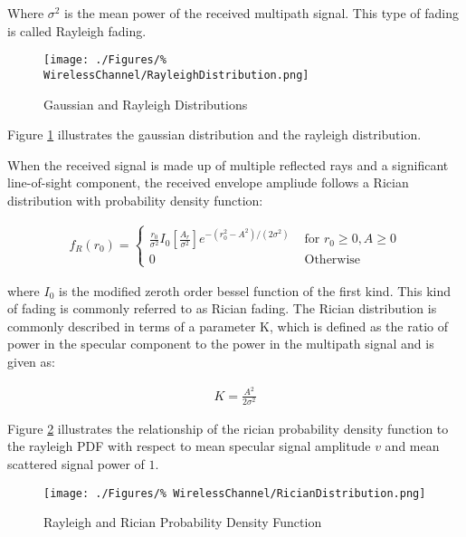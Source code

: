 Where $\sigma^{2}$ is the mean power of the received %
multipath signal. This type of fading is called Rayleigh %
fading.

\begin{figure}[h!]
	\texttt{[image: ./Figures/\%
	WirelessChannel/RayleighDistribution.png]}
	\caption{Gaussian and Rayleigh Distributions%
	\cite{Jakes74}}
	\label{fig:RayleighDistribution}
\end{figure}

Figure \ref{fig:RayleighDistribution} illustrates %
the gaussian distribution and the rayleigh %
distribution.

When the received signal is made up of multiple %
reflected rays and a significant line-of-sight %
component, the received envelope ampliude %
follows a Rician distribution with probability density %
function:

\begin{align}
	f_{R}(r_{0}) = \begin{cases}
		\frac{r_{0}}{\sigma^{2}}I_{0}%
		\left[ \frac{A_{r}}{\sigma^{2}} \right]%
		e^{-(r_{0}^{2}-A^{2})/(2 \sigma^{2})}%
		 & \text{ for } r_{0} \geq 0, A \geq 0\\
		0 & \text{ Otherwise}
	\end{cases}
	\label{eq:RicianPDF}
\end{align}

where $I_{0}$ is the modified zeroth order %
bessel function of the first kind. This kind of %
fading is commonly referred to as Rician fading. %
The Rician distribution is commonly described in %
terms of a parameter K\cite{Sklar01}, which is defined as %
the ratio of power in the specular component to the %
power in the multipath signal and is given as:

\begin{align}
	K = \frac{A^{2}}{2\sigma^{2}}
\end{align}

Figure \ref{fig:RicianDistribution} illustrates the relationship %
of the rician probability density function to the rayleigh %
PDF with respect to mean specular signal amplitude $v$ and %
mean scattered signal power of $1$.

\begin{figure}[ht]
	\texttt{[image: ./Figures/\%
	WirelessChannel/RicianDistribution.png]}
	\caption{Rayleigh and Rician Probability %
	Density Function}
	\label{fig:RicianDistribution}
\end{figure}

